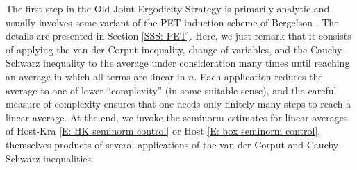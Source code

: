 \documentclass[11pt]{amsart}
\newtheorem{proposition}[lemma]{Proposition}
\theoremstyle{definition}
\newtheorem{example}[lemma]{Example}
\DeclareMathOperator*{\E}{\mathbb{E}}
\newcommand{\N}{{\mathbb N}}
\newcommand{\CX}{{\mathcal X}}
\newcommand{\norm}[1]{\left\Vert #1\right\Vert}
\newcommand{\nnorm}[1]{\lvert\!|\!| #1|\!|\!\rvert}
\newcommand{\1}{{\mathbf{1}}}
\newcommand{\abs}[1]{\mathopen{}\left| #1\mathclose{}\right|}
\newcommand{\BK}[1]{{\color{Apricot}{{#1}}}}
\begin{document}
The first step in the Old Joint Ergodicity Strategy is primarily analytic and usually involves some variant of the PET induction scheme of Bergelson \cite{Ber87}. The details are presented in Section \ref{SSS: PET}. Here, we just remark that it consists of applying the van der Corput inequality, change of variables, and the Cauchy-Schwarz inequality to the average under consideration many times until reaching an average in which all terms are linear in $n$. Each application reduces the average to one of lower ``complexity'' (in some suitable sense), and the careful measure of complexity ensures that one needs only finitely many steps to reach a linear average. At the end, we invoke the seminorm estimates for linear averages of Host-Kra \eqref{E: HK seminorm control} or Host \eqref{E: box seminorm control}, themselves products of several applications of the van der Corput and Cauchy-Schwarz inequalities.
\end{document}
